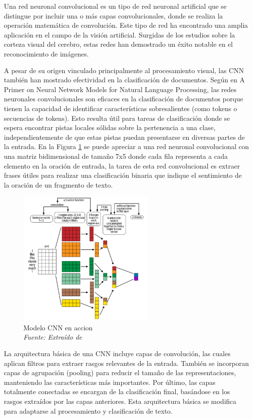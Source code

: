 Una red neuronal convolucional es un tipo de red neuronal artificial que se distingue por incluir una o más capas convolucionales, donde se realiza la operación matemática de convolución. Este tipo de red ha encontrado una amplia aplicación en el campo de la visión artificial. Surgidas de los estudios sobre la corteza visual del cerebro, estas redes han demostrado un éxito notable en el reconocimiento de imágenes.


A pesar de su origen vinculado principalmente al procesamiento visual, las CNN también han mostrado efectividad en la clasificación de documentos. Según \cite{goldberg2016primer} en A Primer on Neural Network Models for Natural Language Processing, las redes neuronales convolucionales son eficaces en la clasificación de documentos porque tienen la capacidad de identificar características sobresalientes (como tokens o secuencias de tokens). Esto resulta útil para tareas de clasificación donde se espera encontrar pistas locales sólidas sobre la pertenencia a una clase, independientemente de que estas pistas puedan presentarse en diversas partes de la entrada. En la Figura \ref{fig:an9} se puede apreciar a una red neuronal convolucional con una matriz bidimensional de tamaño 7x5 donde cada fila representa a cada elemento en la oración de entrada, la tarea de esta red convolucional es extraer frases útiles para realizar una clasificación binaria que indique el sentimiento de la oración de un fragmento de texto.
\begin{figure}[h!]
	\includegraphics[width=0.6\textwidth]{capitulo2/figuras/an9.png}
	\caption[Modelo CNN en accion]{Modelo CNN en accion
		\\\textit{Fuente: Extraído de} \protect\cite[p. 25]{vajjala2020practical}}
	\label{fig:an9}
\end{figure}

La arquitectura básica de una CNN incluye capas de convolución, las cuales aplican filtros para extraer rasgos relevantes de la entrada. También se incorporan capas de agrupación (pooling) para reducir el tamaño de las representaciones, manteniendo las características más importantes. Por último, las capas totalmente conectadas se encargan de la clasificación final, basándose en los rasgos extraídos por las capas anteriores. Esta arquitectura básica se modifica para adaptarse al procesamiento y clasificación de texto.

